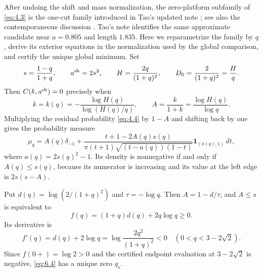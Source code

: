 \documentclass[11pt]{article}
\numberwithin{equation}{section}
\theoremstyle{plain}
\theoremstyle{definition}
\theoremstyle{remark}
\newcommand{\1}{\mathbf 1}
\newcommand{\dd}{\,d}
\begin{document}
After undoing the shift and mass normalization, the zero-platform subfamily
of \eqref{eq:4.3} is the one-cut family introduced in Tao's updated note
\cite[Section~4]{Tao1038Updated}; see also the contemporaneous discussion
\cite{Bloom1038Discussion}.  Tao's note identifies the same approximate
candidate near $a=0.805$ and length $1.835$.  Here we reparametrize the
family by $q$, derive its exterior equations in the normalization used by
the global comparison, and certify the unique global minimum.  Set
\begin{equation}
 s=\frac{1-q}{1+q},\qquad a^{\rm sh}=2s^2,\qquad
 H=\frac{2q}{(1+q)^2},\qquad
 D_0=\frac{2}{(1+q)^2}=\frac Hq.
\label{eq:6.1}
\end{equation}
Then $C(k,a^{\rm sh})=0$ precisely when
\begin{equation}
 k=k(q)=-\frac{\log H(q)}{\log(H(q)/q)},\qquad
 A=\frac{k}{1+k}=\frac{\log H(q)}{\log q}.
\label{eq:6.2}
\end{equation}
Multiplying the residual probability \eqref{eq:4.4} by $1-A$ and shifting back by
one gives the probability measure
\[
 \mu_q=A(q)\delta_{-1}+
 \frac{t+1-2A(q)s(q)}
 {\pi(t+1)\sqrt{(t-a(q))(1-t)}}\1_{(a(q),1)}\dd t,
\]
where $a(q)=2s(q)^2-1$.  Its density is nonnegative if and only if
$A(q)\le s(q)$, because its numerator is increasing and its value at the
left edge is $2s(s-A)$.

Put $d(q)=\log(2/(1+q)^2)$ and $\tau=-\log q$.  Then
$A=1-d/\tau$, and $A\le s$ is equivalent to
\begin{equation}
 f(q)=(1+q)d(q)+2q\log q\ge0.
\label{eq:6.4}
\end{equation}
Its derivative is
\begin{equation}
 f'(q)=d(q)+2\log q
 =\log\frac{2q^2}{(1+q)^2}<0
\quad(0<q<3-2\sqrt2).
\label{eq:6.5}
\end{equation}
Since $f(0+)=\log2>0$ and the certified endpoint evaluation at
$3-2\sqrt2$ is negative, \eqref{eq:6.4} has a unique zero $q_s$.
\end{document}
